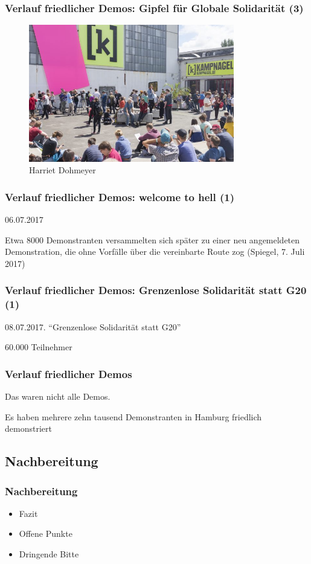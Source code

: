 \documentclass[]{beamer}
\begin{document}
	\begin{frame}
	\frametitle{Verlauf friedlicher Demos: Gipfel für Globale Solidarität (3)}
	\begin{figure}
		\renewcommand{\figurename}{Foto} 
		\includegraphics[width=0.8\textwidth]{images/gipfel-globale-solidaritaet-3}
		\caption{Harriet Dohmeyer}
	\end{figure}
\end{frame}

	\begin{frame}
	\frametitle{Verlauf friedlicher Demos: welcome to hell (1)}
	06.07.2017\par 
	Etwa 8000 Demonstranten versammelten sich später zu einer neu angemeldeten Demonstration, die ohne Vorfälle über die vereinbarte Route zog (Spiegel, 7. Juli 2017)
\end{frame}

	\begin{frame}
	\frametitle{Verlauf friedlicher Demos: Grenzenlose Solidarität statt G20 (1)}
		08.07.2017. \enquote{Grenzenlose Solidarität statt G20}\par
		60.000 Teilnehmer
\end{frame}

	\begin{frame}
	\frametitle{Verlauf friedlicher Demos}
	Das waren nicht alle Demos.\par
	\vfill
	\vfill
	Es haben mehrere zehn tausend Demonstranten in Hamburg friedlich demonstriert 
\end{frame}

	\begin{frame}
	\subsection{Nachbereitung}
	\frametitle{Nachbereitung}
	\begin{itemize}
		\item Fazit
		\item Offene Punkte
		\item Dringende Bitte
	\end{itemize}
\end{frame}
\end{document}
